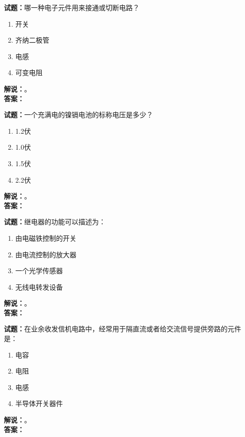 \documentclass{ctexbook}
\begin{document}
\vspace{\baselineskip}

\noindent\textbf{试题：}哪一种电子元件用来接通或切断电路？
\begin{enumerate}[leftmargin=3em]
  \item 开关
  \item 齐纳二极管
  \item 电感
  \item 可变电阻
\end{enumerate}
\noindent\textbf{解说：}\textbf{}。\\\noindent\textbf{答案：}

\vspace{\baselineskip}

\noindent\textbf{试题：}一个充满电的镍镉电池的标称电压是多少？
\begin{enumerate}[leftmargin=3em]
  \item 1.2伏
  \item 1.0伏
  \item 1.5伏
  \item 2.2伏
\end{enumerate}
\noindent\textbf{解说：}\textbf{}。\\\noindent\textbf{答案：}

\vspace{\baselineskip}

\noindent\textbf{试题：}继电器的功能可以描述为：
\begin{enumerate}[leftmargin=3em]
  \item 由电磁铁控制的开关
  \item 由电流控制的放大器
  \item 一个光学传感器
  \item 无线电转发设备
\end{enumerate}
\noindent\textbf{解说：}\textbf{}。\\\noindent\textbf{答案：}

\vspace{\baselineskip}

\noindent\textbf{试题：}在业余收发信机电路中，经常用于隔直流或者给交流信号提供旁路的元件是：
\begin{enumerate}[leftmargin=3em]
  \item 电容
  \item 电阻
  \item 电感
  \item 半导体开关器件
\end{enumerate}
\noindent\textbf{解说：}\textbf{}。\\\noindent\textbf{答案：}
\end{document}
